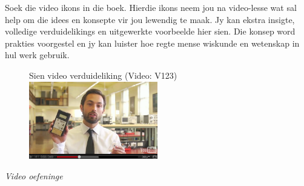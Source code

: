 {

Soek die video ikons in die boek. Hierdie ikons neem jou na video-lesse wat sal help om die idees en konsepte vir jou lewendig te maak. Jy kan ekstra insigte, volledige verduidelikings en uitgewerkte voorbeelde hier sien. Die konsep word prakties voorgestel en jy kan luister hoe regte mense wiskunde en wetenskap in hul werk gebruik. \par

\begin{figure}[h]
\begin{center}
Sien video verduideliking  (Video: V123)\\
\includegraphics[width=0.5\textwidth]{title_images/veritasiumvideo.png}
\end{center}
\end{figure}

}
{\normalfont\sffamily\fontsize{22}\normalfont\itshape Video oefeninge} \par

